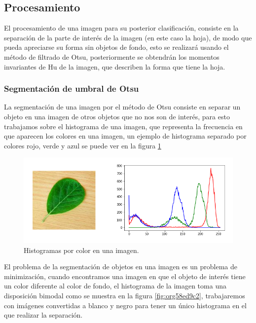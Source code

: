 \documentclass[letter]{article}
\begin{document}
\subsection{Procesamiento}
\label{sec:org413809c}
El procesamiento de una imagen para su posterior clasificación, consiste en la
separación de la parte de interés de la imagen (en este caso la hoja), de modo
que pueda apreciarse su forma sin objetos de fondo, esto se realizará usando el
método de filtrado de Otsu, posteriormente se obtendrán los momentos invariantes
de Hu de la imagen, que describen la forma que tiene la hoja.

\subsubsection{Segmentación de umbral de Otsu}
\label{sec:orgd8d7442}
La segmentación de una imagen por el método de Otsu consiste en separar un
objeto en una imagen de otros objetos que no nos son de interés, para esto
trabajamos sobre el histograma de una imagen, que representa la frecuencia en
que aparecen los colores en una imagen, un ejemplo de histograma separado por
colores rojo, verde y azul se puede ver en la figura \ref{fig:orgac0601c}

\begin{figure}[htbp]
\centering
\includegraphics[width=.9\linewidth]{./images/histogram1.png}
\caption{\label{fig:orgac0601c}Histogramas por color en una imagen.}
\end{figure}

El problema de la segmentación de objetos en una imagen es un problema de
minimización, cuando encontramos una imagen en que el objeto de interés tiene un
color diferente al color de fondo, el histograma de la imagen toma una
disposición bimodal como se muestra en la figura \ref{fig:org58ed9c2}, trabajaremos con
imágenes convertidas a blanco y negro para tener un único histograma en el que
realizar la separación.
\end{document}
